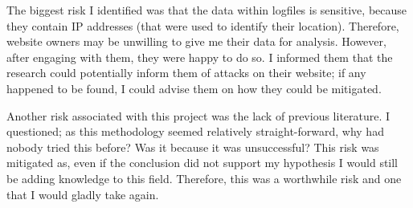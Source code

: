The biggest risk I identified was that the data within logfiles is sensitive, because they contain IP addresses (that were used to identify their location). Therefore, website owners may be unwilling to give me their data for analysis. However, after engaging with them, they were happy to do so. I informed them that the research could potentially inform them of attacks on their website; if any happened to be found, I could advise them on how they could be mitigated. 

Another risk associated with this project was the lack of previous literature. I questioned; as this methodology seemed relatively straight-forward, why had nobody tried this before? Was it because it was unsuccessful? This risk was mitigated as, even if the conclusion did not support my hypothesis I would still be adding knowledge to this field. Therefore, this was a worthwhile risk and one that I would gladly take again.